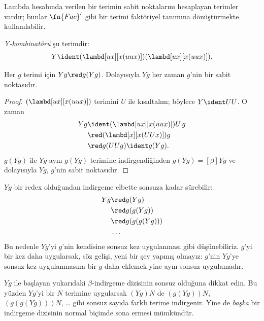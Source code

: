 Lambda hesabında verilen bir terimin sabit noktalarını hesaplayan terimler
vardır; bunlar $\fn{Fac}'$ gibi bir terimi faktöriyel tanımına dönüştürmekte
kullanılabilir.

\begin{defn}
  \emph{Y-kombinatörü} şu terimdir:
  \[
  Y \ident (\lambd[ux][x(uux)])(\lambd[ux][x(uux)]).
  \]
\end{defn}

\begin{thm}
  Her $g$ terimi için $Yg\red g(Yg)$. Dolayısıyla $Yg$ her zaman $g$'nin
  bir sabit noktasıdır.
\end{thm}

\begin{proof}
  $(\lambd[ux][x(uux)])$ terimini $U$ ile kısaltalım; böylece $Y\ident UU$.
  O zaman
  \begin{align*}
    Y g &\ident (\lambd[ux][x(uux)])U\,g \\
    &\red (\lambd[x][x(UUx)])g\\
    & \red g(UUg) \ident g(Yg).
  \end{align*}
  $g(Yg)$ ile $Yg$ aynı $g(Yg)$ terimine indirgendiğinden
  $g(Yg)\equal[\beta]Yg$ ve dolayısıyla $Yg$, $g$'nin sabit noktasıdır.
\end{proof}

$Yg$ bir redex olduğundan indirgeme elbette sonsuza kadar sürebilir:
\begin{align*}
  Y g &\red g (Y g) \\
    &\red g (g (Y g)) \\
    &\red g(g (g (Y g)))\\
    &\ldots
\end{align*}
Bu nedenle $Yg$'yi $g$'nin kendisine sonsuz kez uygulanması gibi
düşünebiliriz. $g$'yi bir kez daha uygularsak, söz gelişi, yeni bir şey
yapmış olmayız: $g$'nin $Yg$'ye sonsuz kez uygulanmasına bir $g$ daha eklemek
yine aynı sonsuz uygulamadır.

$Yg$ ile başlayan yukarıdaki $\beta$-indirgeme dizisinin sonsuz olduğuna
dikkat edin. Bu yüzden $Yg$'yi bir $N$ terimine uygularsak $(Yg)N$ de
$(g(Yg))N$, $(g(g(Yg)))N$, \dots{} gibi sonsuz sayıda farklı terime
indirgenir. Yine de \emph{başka} bir indirgeme dizisinin normal biçimde sona
ermesi mümkündür.

